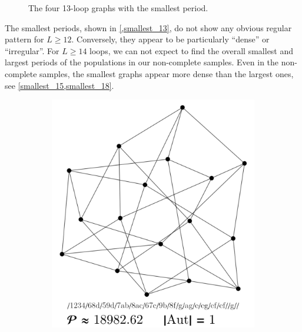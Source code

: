 \documentclass[11pt,a4paper]{article}
\renewcommand{\|}{\rule[-0.4ex]{0.2ex}{1.2em}}
\begin{document}
\begin{figure}[htb]
	\caption{The four 13-loop graphs with the smallest period.}
	\label{smallest_13}
\end{figure}

The smallest periods, shown in \cref{,smallest_13}, do not show any obvious regular pattern for $L \geq 12$. Conversely, they appear to be particularly \enquote{dense} or \enquote{irregular}. 
For $L\geq 14$ loops,  we can not expect to find the overall smallest and largest periods of the populations in our non-complete samples.
Even in the non-complete samples, the smallest graphs  appear more dense than the largest ones, see \cref{smallest_15,smallest_18}.


\begin{figure}[htb]
	\begin{subfigure}[b]{.24 \textwidth}
		\includegraphics[width=\linewidth]{smallest_15_1}
		\subcaption{}
	\end{subfigure}
	\begin{subfigure}[b]{.24 \textwidth}

\end{subfigure}
\end{figure}
\end{document}
